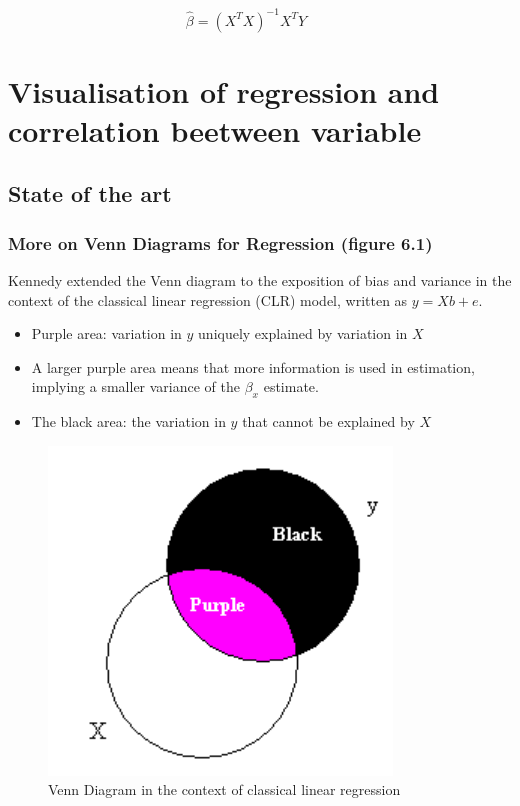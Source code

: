 \documentclass[
]{report}
\providecommand{\tightlist}{%
  \setlength{\itemsep}{0pt}\setlength{\parskip}{0pt}}
\begin{document}
\[\displaystyle {\hat {\beta}}=(X^{T}X)^{-1}X^{T}Y\qquad\]

\hypertarget{visualisation-of-regression-and-correlation-beetween-variable}{%
\chapter{Visualisation of regression and correlation beetween variable}\label{visualisation-of-regression-and-correlation-beetween-variable}}

\hypertarget{state-of-the-art-1}{%
\section{State of the art}\label{state-of-the-art-1}}

\hypertarget{more-on-venn-diagrams-for-regression-figure-6.1}{%
\subsection{More on Venn Diagrams for Regression (figure 6.1)}\label{more-on-venn-diagrams-for-regression-figure-6.1}}

Kennedy \citep{kennedy} extended the Venn diagram to the exposition of bias and variance in the context of the classical linear regression (CLR) model, written as \(y = Xb + e\).

\begin{itemize}
\tightlist
\item
  Purple area: variation in \(y\) uniquely explained by variation in \(X\)
\item
  A larger purple area means that more information is used in estimation, implying a smaller variance of the \(\beta_x\) estimate.
\item
  The black area: the variation in \(y\) that cannot be explained by \(X\)
\end{itemize}

\begin{figure}
    \centering
    \includegraphics[width= 250 pt]{vennken.PNG}
    \caption{Venn Diagram in the context of classical linear regression}
\end{figure}
\end{document}
